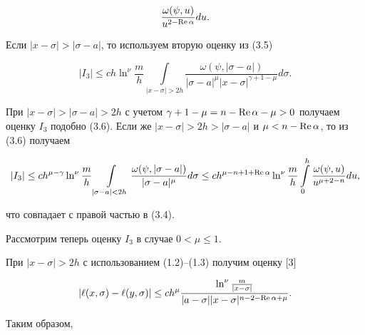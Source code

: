\begin{pf}
\begin{equation}
\frac{\omega(\psi,u)}{u^{2-\re \alpha}} du.


\end{equation}





Если $|x-\sigma| > |\sigma-a|$, то используем вторую оценку из (3.5)


$$


|I_3| \le ch\ln^\nu \frac{m}{h} \int \limits_{|x-\sigma|>2h}


\frac{\omega(\psi,|\sigma-a|)}


{|\sigma-a|^\mu |x-\sigma|^{\gamma+1-\mu}} d\sigma.


$$


При $|x-\sigma| > |\sigma-a| > 2h$ с учетом $\gamma + 1 - \mu= n-\re


\alpha- \mu > 0$ получаем оценку $I_3$ подобно (3.6). Если же $|x-\sigma|


> 2h > |\sigma-a|$ и $\mu < n-\re \alpha$, то из (3.6) получаем


$$


|I_3| \le ch^{\mu-\gamma} \ln^\nu \frac{m}{h} \int \limits_{|\sigma-


a|<2h} \frac{\omega(\psi,|\sigma-a|)}{|\sigma-a|^\mu}d\sigma \le


ch^{\mu-n+1+\re \alpha}\ln^\nu \frac{m}{h} \int \limits_0^h


\frac{\omega(\psi,u)}


{u^{\mu+2-n}}du,


$$


что совпадает с правой частью в (3.4).





Рассмотрим теперь оценку $I_3$ в случае $0 < \mu \le 1$.


При $|x-\sigma|>2h$ с использованием (1.2)--(1.3) получим оценку [3]


\begin{equation}


|\ell(x,\sigma) - \ell(y,\sigma)| \le ch^\mu \frac{\ln^\nu \frac{m}{|x-


\sigma|}}{|a-\sigma||x-\sigma|^{n-2-\re\alpha+\mu}}.


\end{equation}





Таким образом,


\begin{equation}



\end{equation}
\end{pf}
